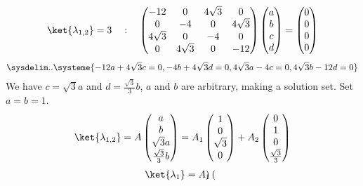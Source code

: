 \documentclass{article}
\begin{document}
\begin{enumerate}
		\begin{align}
			\ket{\lambda_{1,2}} = 3 \quad : \quad
			\begin{pmatrix}
				-12 & 0 & 4\sqrt{3} & 0 \\
				0 & -4 & 0 & 4\sqrt{3} \\
				4\sqrt{3} & 0 & -4 & 0 \\
				0 & 4\sqrt{3} & 0 & -12
			\end{pmatrix}
			\begin{pmatrix}
				a \\
				b \\
				c \\
				d
			\end{pmatrix}
			= \begin{pmatrix}
				0 \\
				0 \\
				0 \\
				0
			\end{pmatrix}
		\end{align}
		\begin{equation}
			\sysdelim..\systeme{
				-12a + 4\sqrt{3}c = 0,
				-4b + 4\sqrt{3}d = 0,
				4\sqrt{3}a - 4c = 0,
				4\sqrt{3}b - 12d = 0
			}
		\end{equation}
		We have $c = \sqrt{3}a$ and $d = \frac{\sqrt{3}}{3}b$, $a$ and $b$ are arbitrary, making a solution set. Set $a=b=1$.
		\begin{equation}
			\ket{\lambda_{1,2}} = A \begin{pmatrix}
				a \\
				b \\
				\sqrt{3}a \\
				\frac{\sqrt{3}}{3}b
			\end{pmatrix}
			= A_1 \begin{pmatrix}
				1 \\
				0 \\
				\sqrt{3} \\
				0
			\end{pmatrix} + A_2 \begin{pmatrix}
				0 \\
				1 \\
				0 \\
				\frac{\sqrt{3}}{3}
			\end{pmatrix}
		\end{equation}
		\begin{equation}
			\begin{split}
				\ket{\lambda_1} &= A_1 \begin{pmatrix}

\end{pmatrix}
\end{split}
\end{equation}
\end{enumerate}
\end{document}
